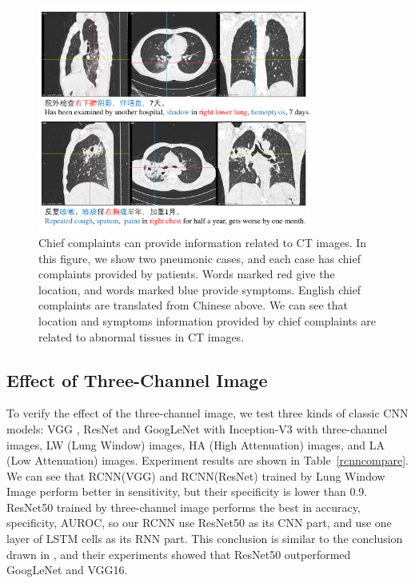\begin{figure}[t]
    \centerline{\includegraphics[width=90mm]{txtpic.pdf}}
    \vspace{-0cm}
    \caption{Chief complaints can provide information related to CT images. In this figure, we show two pneumonic cases, and each case has chief complaints provided by patients. Words marked red give the location, and words marked blue provide symptoms. English chief complaints are translated from Chinese above. We can see that location and symptoms information provided by chief complaints are related to abnormal tissues in CT images.}
    \vspace{-0cm}
    \label{txtpic}
    \end{figure}
    

\subsection{Effect of Three-Channel Image}
\label{effectiveness}
To verify the effect of the three-channel image, we test three kinds of classic CNN models: VGG \cite{simonyan2015very}, ResNet \cite{he2016deep} and GoogLeNet with Inception-V3 \cite{szegedy2016rethinking} with three-channel images, LW (Lung Window) images, HA (High Attenuation) images, and LA (Low Attenuation) images. Experiment results are shown in Table~\ref{rcnncompare}. 
We can see that RCNN(VGG) and RCNN(ResNet) trained by Lung Window Image perform better in sensitivity, but their specificity is lower than 0.9. ResNet50 trained by three-channel image performs the best in accuracy, specificity, AUROC, so our RCNN use ResNet50 as its CNN part, and use one layer of LSTM cells as its RNN part. 
This conclusion is similar to the conclusion drawn in \cite{Wang2017ChestX}, and their experiments showed that ResNet50 outperformed GoogLeNet and VGG16.

